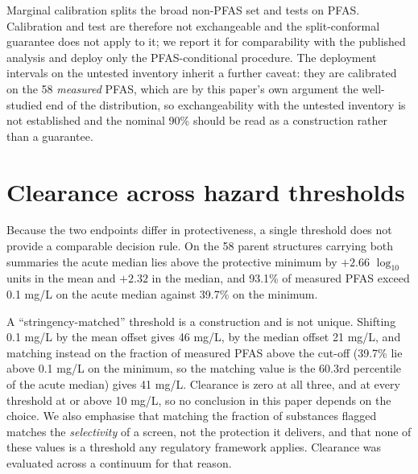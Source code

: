 \documentclass[11pt]{article}
\begin{document}
Marginal calibration splits the broad non-PFAS set and tests on PFAS. Calibration
and test are therefore not exchangeable and the split-conformal guarantee does
not apply to it; we report it for comparability with the published analysis and
deploy only the PFAS-conditional procedure. The deployment intervals on the
untested inventory inherit a further caveat: they are calibrated on the 58
\emph{measured} PFAS, which are by this paper's own argument the well-studied end
of the distribution, so exchangeability with the untested inventory is not
established and the nominal 90\% should be read as a construction rather than a
guarantee.

\section{Clearance across hazard thresholds}

Because the two endpoints differ in protectiveness, a single threshold does not
provide a comparable decision rule. On the 58 parent structures carrying both
summaries the acute median lies above the protective minimum by $+2.66$
$\log_{10}$ units in the mean and $+2.32$ in the median, and 93.1\% of measured
PFAS exceed 0.1 mg/L on the acute median against 39.7\% on the minimum.

A ``stringency-matched'' threshold is a construction and is not unique. Shifting
0.1 mg/L by the mean offset gives 46 mg/L, by the median offset 21 mg/L, and
matching instead on the fraction of measured PFAS above the cut-off (39.7\% lie
above 0.1 mg/L on the minimum, so the matching value is the 60.3rd percentile of
the acute median) gives 41 mg/L. Clearance is zero at all three, and at every threshold at or above 10
mg/L, so no conclusion in this paper depends on the choice. We also emphasise
that matching the fraction of substances flagged matches the \emph{selectivity}
of a screen, not the protection it delivers, and that none of these values is a
threshold any regulatory framework applies. Clearance was evaluated across a
continuum for that reason.
\end{document}
